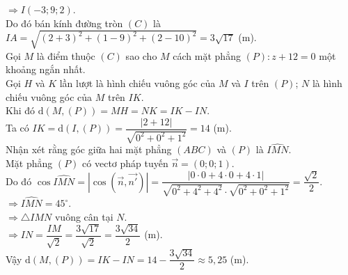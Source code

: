 \begin{ex}
{		$\Rightarrow I(-3;9;2)$. \\
		Do đó bán kính đường tròn $(C)$ là $IA=\sqrt{(2+3)^2+(1-9)^2+(2-10)^2}=3\sqrt{17}$ (m). \\
		Gọi $M$ là điểm thuộc $(C)$ sao cho $M$ cách mặt phẳng $(P) \colon z+12=0$ một khoảng ngắn nhất. \\
		Gọi $H$ và $K$ lần lượt là hình chiếu vuông góc của $M$ và $I$ trên $(P)$; $N$ là hình chiếu vuông góc của $M$ trên $IK$. \\
		Khi đó $\mathrm{d}\left(M,(P)\right)=MH=NK=IK-IN$. \\
		Ta có $IK=\mathrm{d}(I,(P))=\dfrac{|2+12|}{\sqrt{0^2+0^2+1^2}}=14$ (m). \\
		Nhận xét rằng góc giữa hai mặt phẳng $(ABC)$ và $(P)$ là $\widehat{IMN}$. \\
		Mặt phẳng $(P)$ có vectơ pháp tuyến $\overrightarrow{n}=(0;0;1)$. \\
		Do đó $\cos\widehat{IMN}=\left|\cos\left(\overrightarrow{n},\overrightarrow{n'}\right)\right|=\dfrac{|0 \cdot 0+4 \cdot 0+4 \cdot 1|}{\sqrt{0^2+4^2+4^2} \cdot \sqrt{0^2+0^2+1^2}}=\dfrac{\sqrt{2}}{2}$. \\
		$\Rightarrow \widehat{IMN}=45^\circ$. \\
		$\Rightarrow \triangle IMN$ vuông cân tại $N$. \\
		$\Rightarrow IN=\dfrac{IM}{\sqrt{2}}=\dfrac{3\sqrt{17}}{\sqrt{2}}=\dfrac{3\sqrt{34}}{2}$ (m). \\
		Vậy $\mathrm{d}(M,(P))=IK-IN=14-\dfrac{3\sqrt{34}}{2} \approx 5{,}25$ (m). 
	}
\end{ex}

